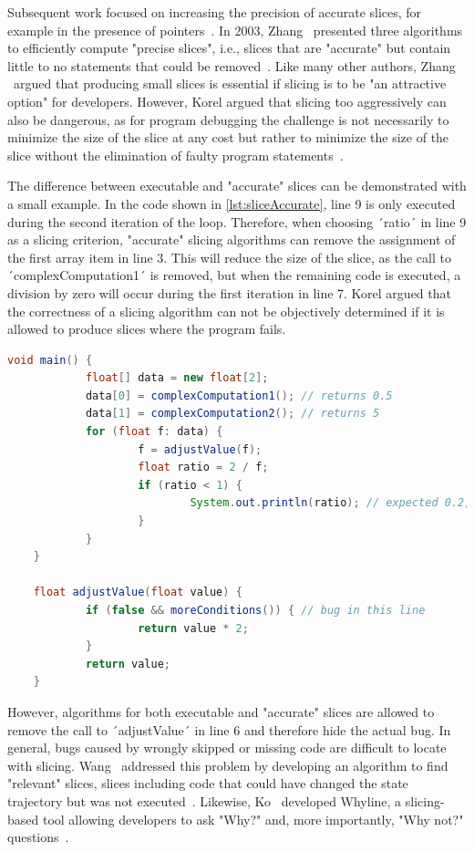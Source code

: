 Subsequent work focused on increasing the precision of accurate slices, for example in the presence of pointers~\cite{atkinson02:program_slicing_using_dynamic}.
In 2003, Zhang \etal\ presented three algorithms to efficiently compute "precise slices", i.e., slices that are "accurate" but contain little to no statements that could be removed~\cite{zhang03:precise_dynamic_slicing_algorithms}.
Like many other authors, Zhang \etal\ argued that producing small slices is essential if slicing is to be "an attractive option" for developers.
However, Korel argued that slicing too aggressively can also be dangerous, as
for program debugging the challenge is not necessarily to minimize the size of the slice at any cost but rather to minimize the size of the slice without the elimination of faulty program statements~\cite{korel98:dynamic_program_slicing_methods}.

The difference between executable and "accurate" slices can be demonstrated with a small example.
In the code shown in \cref{lst:sliceAccurate}, line 9 is only executed during the second iteration of the loop.
Therefore, when choosing ´ratio´ in line 9 as a slicing criterion, "accurate" slicing algorithms can remove the assignment of the first array item in line 3.
This will reduce the size of the slice, as the call to ´complexComputation1´ is removed, but when the remaining code is executed, a division by zero will occur during the first iteration in line 7.
Korel argued that the correctness of a slicing algorithm can not be objectively determined if it is allowed to produce slices where the program fails.

\begin{lstlisting}[float,caption={Code example for accurate slices.},stepnumber=2,numberfirstline=false,label=lst:sliceAccurate,language=Java]
	void main() {
			float[] data = new float[2];
			data[0] = complexComputation1(); // returns 0.5
			data[1] = complexComputation2(); // returns 5
			for (float f: data) {
					f = adjustValue(f);
					float ratio = 2 / f;
					if (ratio < 1) {
							System.out.println(ratio); // expected 0.2, got 0.4
					}
			}
	}

	float adjustValue(float value) {
			if (false && moreConditions()) { // bug in this line
					return value * 2;
			}
			return value;
	}
\end{lstlisting}

However, algorithms for both executable and "accurate" slices are allowed to remove the call to ´adjustValue´ in line 6 and therefore hide the actual bug.
In general, bugs caused by wrongly skipped or missing code are difficult to locate with slicing.
Wang \etal\ addressed this problem by developing an algorithm to find "relevant" slices, slices including code that could have changed the state trajectory but was not executed~\cite{wang08:dynamic_slicing_on_java}.
Likewise, Ko \etal\ developed Whyline, a slicing-based tool allowing developers to ask "Why?" and, more importantly, "Why not?" questions~\cite{ko08:debugging_reinvented_asking}.


